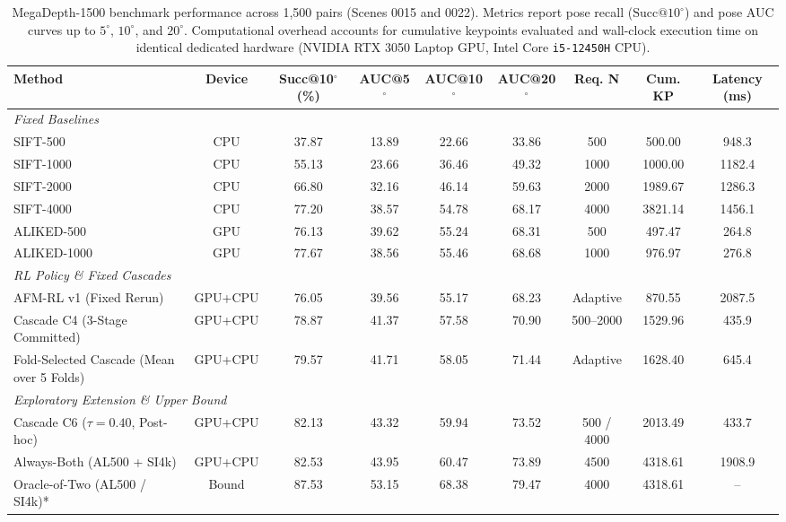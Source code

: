\documentclass[conference]{IEEEtran}
\begin{document}
\begin{table}[t]
\centering
\setlength{\tabcolsep}{2.5pt}
\footnotesize
\caption{MegaDepth-1500 benchmark performance across 1,500 pairs (Scenes 0015 and 0022). Metrics report pose recall ($\text{Succ}@10^\circ$) and pose AUC curves up to $5^\circ$, $10^\circ$, and $20^\circ$. Computational overhead accounts for cumulative keypoints evaluated and wall-clock execution time on identical dedicated hardware (NVIDIA RTX 3050 Laptop GPU, Intel Core \texttt{i5-12450H} CPU).}
\label{tab:megadepth_main}
\begin{tabular}{lcccccccc}
\hline
\textbf{Method} & \textbf{Device} & \textbf{Succ@10$^\circ$ (\%)} & \textbf{AUC@5$^\circ$} & \textbf{AUC@10$^\circ$} & \textbf{AUC@20$^\circ$} & \textbf{Req. N} & \textbf{Cum. KP} & \textbf{Latency (ms)} \\
\hline
\multicolumn{9}{l}{\textit{Fixed Baselines}} \\
SIFT-500 & CPU & 37.87 & 13.89 & 22.66 & 33.86 & 500 & 500.00 & 948.3 \\
SIFT-1000 & CPU & 55.13 & 23.66 & 36.46 & 49.32 & 1000 & 1000.00 & 1182.4 \\
SIFT-2000 & CPU & 66.80 & 32.16 & 46.14 & 59.63 & 2000 & 1989.67 & 1286.3 \\
SIFT-4000 & CPU & 77.20 & 38.57 & 54.78 & 68.17 & 4000 & 3821.14 & 1456.1 \\
ALIKED-500 & GPU & 76.13 & 39.62 & 55.24 & 68.31 & 500 & 497.47 & 264.8 \\
ALIKED-1000 & GPU & 77.67 & 38.56 & 55.46 & 68.68 & 1000 & 976.97 & 276.8 \\
\hline
\multicolumn{9}{l}{\textit{RL Policy \& Fixed Cascades}} \\
AFM-RL v1 (Fixed Rerun) & GPU+CPU & 76.05 & 39.56 & 55.17 & 68.23 & Adaptive & 870.55 & 2087.5 \\
Cascade C4 (3-Stage Committed) & GPU+CPU & 78.87 & 41.37 & 57.58 & 70.90 & 500--2000 & 1529.96 & 435.9 \\
Fold-Selected Cascade (Mean over 5 Folds) & GPU+CPU & 79.57 & 41.71 & 58.05 & 71.44 & Adaptive & 1628.40 & 645.4 \\
\hline
\multicolumn{9}{l}{\textit{Exploratory Extension \& Upper Bound}} \\
Cascade C6 ($\tau=0.40$, Post-hoc) & GPU+CPU & 82.13 & 43.32 & 59.94 & 73.52 & 500 / 4000 & 2013.49 & 433.7 \\
Always-Both (AL500 + SI4k) & GPU+CPU & 82.53 & 43.95 & 60.47 & 73.89 & 4500 & 4318.61 & 1908.9 \\
Oracle-of-Two (AL500 / SI4k)* & Bound & 87.53 & 53.15 & 68.38 & 79.47 & 4000 & 4318.61 & -- \\
\hline
\end{tabular}
\end{table}
\end{document}

